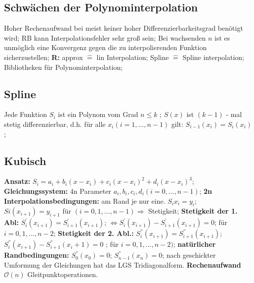 \subsection{Schwächen der Polynominterpolation}
Hoher Rechenaufwand bei meist keiner hoher Differenzierbarkeitsgrad benötigt wird; RB kann Interpolationsfehler sehr groß sein; Bei wachsenden $n$ ist es unmöglich eine Konvergenz gegen die zu interpolierenden Funktion sicherzustellen;
\textbf{R:} 
approx $\hat{=}$ lin Interpolation; 
Spline $\hat{=}$ Spline interpolation; 
Bibliotheken für Polynominterpolation;
\subsection{Spline}
Jede Funktion $ S_{i} $ ist ein Polynom vom Grad  $ n \le k $ ; 
$ S(x) $ ist $ ( k -1 ) $ - mal stetig differenzierbar, d.h. für alle $ x_{i} ( i = 1, ..., n-1 ) $ gilt: $ S_{ i-1 } ( x_{ i } ) = S_{ i } ( x_{i} ) $; 
\subsection{Kubisch}
\textbf{Ansatz:} $ S_{ i } = a_{ i } + b_{ i } ( x- x_{ i } ) + c_{ i } (x-x_{i})^{2} + d_{i} (x-x_{i})^{3}$; 
\textbf{Gleichungssystem:} 4n Parameter $ a_{i}, b_{i}, c_{i}, d_{i} ( i=0, ..., n-1) $; 
\textbf{2n Interpolationsbedingungen:} am Rand je nur eine. $ S_{i} x_{i} = y_{i}$; 
$ Si (x_{i+1}) = y_{i+1}$ für $  ( i= 0, 1, ..., n-1) \Rightarrow $ Stetigkeit; 
\textbf{Stetigkeit der 1. Abl:} 
$ S_{i}^{'} (x_{i+1}) = S_{i+1}^{'}(x_{i+1}) $; 
$ \Leftrightarrow S_{i}^{'}(x_{i+1}) - S_{i+1}^{'} ( x_{i+1}) = 0 $; 
für $ i = 0, 1, ..., n-2 $; 
\textbf{Stetigkeit der 2. Abl.:} 
$ S_{i}^{''} (x_{i+1}) = S_{i+1}^{''} (x_{i+1}) $; 
$ S_{i}^{''}(x_{i+1}) - S_{i+1}^{''}(x_{i}+1) = 0 $ ; für $ i=0,1,...,n-2) $; 
\textbf{natürlicher Randbedingungen:}
$ S_{0}^{''}(x_{0}) = 0 $; 
$ S_{n-1}^{''}(x_{n}) = 0 $; 
nach geschickter Umformung der Gleichungen hat das LGS Tridiagonalform. 
\textbf{Rechenaufwand} $ \mathcal O ( n ) $ Gleitpunktoperationen.